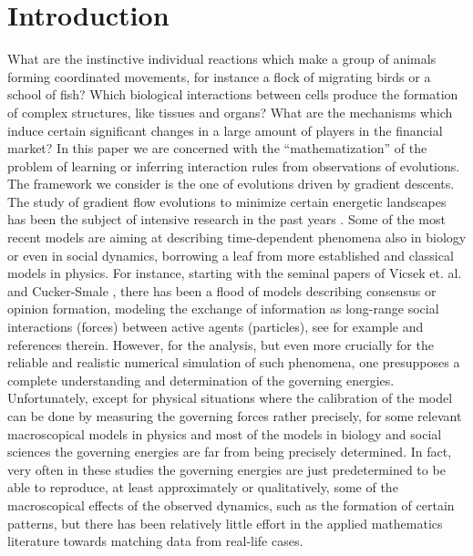 \section{Introduction}

What are the instinctive individual reactions which make a group of animals forming coordinated movements, for instance a flock of migrating birds or a school of fish? Which biological interactions between cells produce the formation of complex structures, like tissues and organs? What are the mechanisms which induce certain significant changes in a large amount of players in the financial market? 
In this paper we are concerned with the ``mathematization'' of the problem of learning or inferring interaction rules from observations of evolutions. The framework we consider is the one of  evolutions driven by gradient descents.
The study of gradient flow evolutions to minimize  certain energetic landscapes has been the subject of intensive research in the past years \cite{AGS}. Some of the most recent models are  aiming at describing time-dependent phenomena also in biology or even in social dynamics, borrowing a leaf from more established and classical  models in physics. For instance, starting with the seminal papers of Vicsek et. al. \cite{VCBCS95} and Cucker-Smale \cite{CucSma07}, there has been a flood of models describing consensus or opinion formation,  modeling the exchange of information as long-range social interactions (forces) between active agents (particles), see for example \cite{parisi08,parisi08-1,parisi08-2,Hildenbrandt01112010,mann11,heoemascszwa11,Motsch2011} and references therein. However, for the analysis, but even more crucially for the reliable and realistic numerical simulation of such phenomena, one presupposes a complete understanding and determination of the governing energies. Unfortunately, except for physical situations where the calibration of the model can be done by measuring the governing forces rather precisely, for some relevant macroscopical models in physics and most of the models in biology and social sciences the governing energies are far from being precisely determined. In fact, very often in these studies the governing energies are just predetermined to be able to reproduce, at least approximately or qualitatively, some of the macroscopical effects of the observed dynamics, such as the formation of certain patterns, but there has been relatively little effort in the applied mathematics literature towards matching data from real-life cases. 

